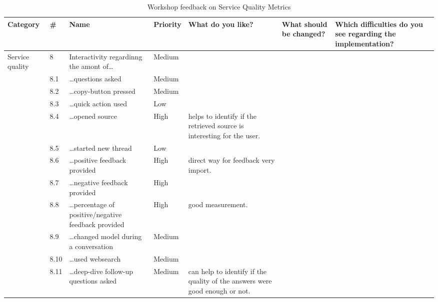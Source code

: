 \documentclass[
	english,
	ruledheaders=section,%
	class=report,%
	thesis={type=bachelor},%
	accentcolor=1b,%
	custommargins=true,%
	marginpar=false,%
	parskip=half-,%
	fontsize=11pt,%
	DIV=14,
]{tudapub}
\begin{document}
\begin{table}
    \centering
    \small 
    \caption{Workshop feedback on Service Quality Metrics}
    \label{tab:service_quality}
    \begin{tabularx}{\textheight}{p{2.2cm} l >{\RaggedRight\arraybackslash}X l >{\RaggedRight\arraybackslash}X >{\RaggedRight\arraybackslash}X >{\RaggedRight\arraybackslash}X}
        \toprule
        \textbf{Category} & \textbf{\#} & \textbf{Name} & \textbf{Priority} & \textbf{What do you like?} & \textbf{What should be changed?} & \textbf{Which difficulties do you see regarding the implementation?} \\
        \midrule
        \multirow{12}{=}{Service quality} 
        & 8 & Interactivity regardinng the amont of\dots & Medium & & & \\
        \cmidrule(l){2-7}
        & 8.1 & \dots questions asked & Medium & & & \\
        \cmidrule(l){2-7}
        & 8.2 & \dots copy-button pressed & Medium & & & \\
        \cmidrule(l){2-7}
        & 8.3 & \dots quick action used & Low & & & \\
        \cmidrule(l){2-7}
        & 8.4 & \dots opened source & High & helps to identify if the retrieved source is interesting for the user. & & \\
        \cmidrule(l){2-7}
        & 8.5 & \dots started new thread & Low & & & \\
        \cmidrule(l){2-7}
        & 8.6 & \dots positive feedback provided & High & direct way for feedback very import. & & \\
        \cmidrule(l){2-7}
        & 8.7 & \dots negative feedback provided & High & & & \\
        \cmidrule(l){2-7}
        & 8.8 & \dots percentage of positive/negative feedback provided & High & good measurement. & & \\
        \cmidrule(l){2-7}
        & 8.9 & \dots changed model during a conversation & Medium & & & \\
        \cmidrule(l){2-7}
        & 8.10 & \dots used websearch & Medium & & & \\
        \cmidrule(l){2-7}
        & 8.11 & \dots deep-dive follow-up questions asked & Medium & can help to identify if the quality of the answers were good enough or not. & & \\
        \bottomrule
    \end{tabularx}
\end{table}
\end{document}
